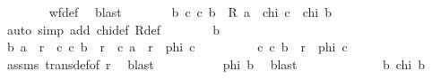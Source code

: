 \begin{isabellebody}
\ \ \ \ \ \ \isamarkupfalse%
\ wf{\isacharunderscore}{\kern0pt}def\ \isamarkupfalse%
\ blast\isanewline
\ \ \ \ \isamarkupfalse%
\ \isamarkupfalse%
\ {\isachardoublequoteopen}{\isasymforall}b{\isachardot}{\kern0pt}\ {\isacharparenleft}{\kern0pt}{\isasymforall}c{\isachardot}{\kern0pt}\ {\isacharparenleft}{\kern0pt}c{\isacharcomma}{\kern0pt}\ b{\isacharparenright}{\kern0pt}\ {\isasymin}\ R\ a\ {\isasymlongrightarrow}\ chi\ c{\isacharparenright}{\kern0pt}\ {\isasymlongrightarrow}\ chi\ b{\isachardoublequoteclose}\isanewline
\ \ \ \ \isamarkupfalse%
\ {\isacharparenleft}{\kern0pt}auto\ simp\ add{\isacharcolon}{\kern0pt}\ chi{\isacharunderscore}{\kern0pt}def\ R{\isacharunderscore}{\kern0pt}def{\isacharparenright}{\kern0pt}\isanewline
\ \ \ \ \ \ \isamarkupfalse%
\ b\isanewline
\ \ \ \ \ \ \isamarkupfalse%
\ {\isachardoublequoteopen}{\isacharparenleft}{\kern0pt}b{\isacharcomma}{\kern0pt}\ a{\isacharparenright}{\kern0pt}\ {\isasymin}\ r{\isachardoublequoteclose}\ \ {\isachardoublequoteopen}{\isasymforall}c{\isachardot}{\kern0pt}\ {\isacharparenleft}{\kern0pt}c{\isacharcomma}{\kern0pt}\ b{\isacharparenright}{\kern0pt}\ {\isasymin}\ r\ {\isasymand}\ {\isacharparenleft}{\kern0pt}c{\isacharcomma}{\kern0pt}\ a{\isacharparenright}{\kern0pt}\ {\isasymin}\ r\ {\isasymlongrightarrow}\ phi\ c{\isachardoublequoteclose}\isanewline
\ \ \ \ \ \ \isamarkupfalse%
\ \isamarkupfalse%
\ {\isachardoublequoteopen}{\isasymforall}c{\isachardot}{\kern0pt}\ {\isacharparenleft}{\kern0pt}c{\isacharcomma}{\kern0pt}\ b{\isacharparenright}{\kern0pt}\ {\isasymin}\ r\ {\isasymlongrightarrow}\ phi\ c{\isachardoublequoteclose}\isanewline
\ \ \ \ \ \ \ \ \isamarkupfalse%
\ assms\ trans{\isacharunderscore}{\kern0pt}def{\isacharbrackleft}{\kern0pt}of\ r{\isacharbrackright}{\kern0pt}\ \isamarkupfalse%
\ blast\isanewline
\ \ \ \ \ \ \isamarkupfalse%
\ {\isacharasterisk}{\kern0pt}{\isacharasterisk}{\kern0pt}\ \isamarkupfalse%
\ {\isachardoublequoteopen}phi\ b{\isachardoublequoteclose}\ \isamarkupfalse%
\ blast\isanewline
\ \ \ \ \isamarkupfalse%
\isanewline
\ \ \ \ \isamarkupfalse%
\ \isamarkupfalse%
\ \ {\isachardoublequoteopen}{\isasymforall}b{\isachardot}{\kern0pt}\ chi\ b{\isachardoublequoteclose}\ \isacommand{{\isachardot}{\kern0pt}}\isamarkupfalse%
\isanewline
\ \ \ \ \isamarkupfalse%

\end{isabellebody}
